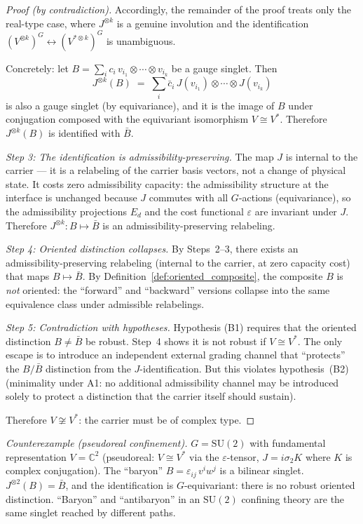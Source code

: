 \documentclass[11pt]{article}
\theoremstyle{definition}
\newcommand{\SU}{\mathrm{SU}}
\begin{document}
\begin{proof}[Proof (by contradiction)]
\smallskip\noindent Accordingly, the remainder of the proof treats only
the real-type case, where $J^{\otimes k}$ is a genuine involution and
the identification $(V^{\otimes k})^G \leftrightarrow (V^{*\otimes k})^G$
is unambiguous.

Concretely: let $B = \sum_i c_i\, v_{i_1} \otimes \cdots \otimes v_{i_k}$
be a gauge singlet.  Then
\[
  J^{\otimes k}(B)
  \;=\; \sum_i \bar{c}_i\, J(v_{i_1}) \otimes \cdots \otimes J(v_{i_k})
\]
is also a gauge singlet (by equivariance), and it is the image of $B$ under
conjugation composed with the equivariant isomorphism $V \cong V^*$.
Therefore $J^{\otimes k}(B)$ is identified with $\bar{B}$.

\textit{Step 3: The identification is admissibility-preserving.}\quad
The map $J$ is internal to the carrier --- it is a relabeling of the carrier
basis vectors, not a change of physical state.  It costs zero admissibility
capacity: the admissibility structure at the interface is unchanged because
$J$ commutes with all $G$-actions (equivariance), so the admissibility
projections $E_d$ and the cost functional $\varepsilon$ are invariant under
$J$.  Therefore $J^{\otimes k}: B \mapsto \bar{B}$ is an
admissibility-preserving relabeling.

\textit{Step 4: Oriented distinction collapses.}\quad
By Steps~2--3, there exists an admissibility-preserving relabeling
(internal to the carrier, at zero capacity cost) that maps $B \mapsto \bar{B}$.
By Definition~\ref{def:oriented_composite}, the composite $B$ is
\emph{not} oriented: the ``forward'' and ``backward'' versions collapse
into the same equivalence class under admissible relabelings.

\textit{Step 5: Contradiction with hypotheses.}\quad
Hypothesis (B1) requires that the oriented distinction $B \ne \bar{B}$ be
robust.  Step~4 shows it is not robust if $V \cong V^*$.  The only escape
is to introduce an independent external grading channel that ``protects''
the $B / \bar{B}$ distinction from the $J$-identification.  But this
violates hypothesis~(B2) (minimality under A1: no additional admissibility
channel may be introduced solely to protect a distinction that the carrier
itself should sustain).

Therefore $V \not\cong V^*$: the carrier must be of complex type.
\end{proof}

\noindent\textit{Counterexample (pseudoreal confinement).}\quad
$G = \SU(2)$ with fundamental representation $V = \mathbb{C}^2$
(pseudoreal: $V \cong V^*$ via the $\varepsilon$-tensor, $J = i\sigma_2 K$
where $K$ is complex conjugation).  The ``baryon'' $B = \varepsilon_{ij}\, v^i w^j$
is a bilinear singlet.  $J^{\otimes 2}(B) = \bar{B}$, and the identification
is $G$-equivariant: there is no robust oriented distinction.
``Baryon'' and ``antibaryon'' in an $\SU(2)$ confining theory are the
same singlet reached by different paths.
\end{document}
